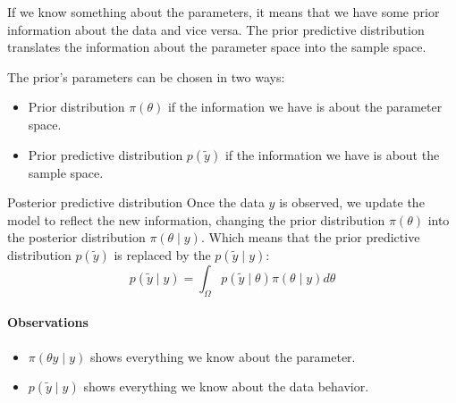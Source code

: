 If we know something about the parameters, it means that we have some prior information about the data
and vice versa. The prior predictive distribution translates the information about the
parameter space into the sample space.

The prior's parameters can be chosen in two ways:
\begin{itemize}
	\item Prior distribution $\pi(\theta)$ if the information we have is about the parameter space.
	\item Prior predictive distribution $p(\tilde y)$ if the information we have is about the sample space.
\end{itemize}

\begin{definition}{Posterior predictive distribution}{}
	Once the data $y$ is observed, we update the model to reflect the new information,
	changing the prior distribution $\pi(\theta)$ into the posterior distribution $\pi(\theta \mid y)$.
	Which means that the prior predictive distribution $p(\tilde y)$ is replaced by the
	 $p(\tilde y \mid y)$:
	\begin{equation}
		p(\tilde y \mid y) = \int_{\Omega} p(\tilde y \mid \theta) \pi(\theta \mid y) d\theta
	\end{equation}

	\paragraph{Observations}
	\begin{itemize}
        \item $\pi(\theta y \mid y)$ shows everything we know about the parameter.
        \item $p(\tilde y \mid y)$ shows everything we know about the data behavior.
	\end{itemize}
\end{definition}

